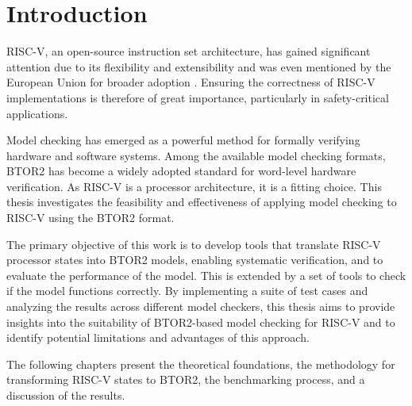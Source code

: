 \chapter{Introduction}\label{chap:intro}

RISC-V, an open-source instruction set architecture, has gained
significant attention due to its flexibility and extensibility and
was even mentioned by the European Union for broader adoption
\cite{eu}. Ensuring the correctness of RISC-V implementations is
therefore of great importance, particularly in safety-critical
applications.

Model checking has emerged as a powerful method for formally
verifying hardware and software systems. Among the available model
checking formats, BTOR2 has become a widely adopted standard for
word-level hardware verification. As RISC-V is a processor
architecture, it is a fitting choice. This thesis investigates the
feasibility and effectiveness of applying model checking to RISC-V
using the BTOR2 format.

The primary objective of this work is to develop tools that translate
RISC-V processor states into BTOR2 models, enabling systematic
verification, and to evaluate the performance of the model. This is
extended by a set of tools to check if the model functions correctly.
By implementing a suite of test cases and analyzing the results
across different model checkers, this thesis aims to provide insights
into the suitability of BTOR2-based model checking for RISC-V and to
identify potential limitations and advantages of this approach.

The following chapters present the theoretical foundations, the
methodology for transforming RISC-V states to BTOR2, the benchmarking
process, and a discussion of the results.